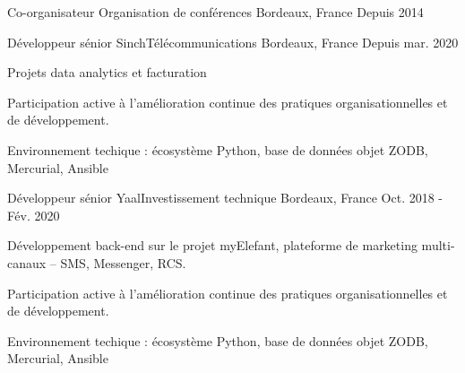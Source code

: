 

\begin{cventries}

  \cventry
    {Co-organisateur}
    {Organisation de conférences}
    {Bordeaux, France}
    {Depuis 2014}
    {
      \begin{cvsubentries}
      \end{cvsubentries}
    }

  \cventry
    {Développeur sénior}
    {Sinch{\enskip\cdotp\enskip}Télécommunications}
    {Bordeaux, France}
    {Depuis mar. 2020}
    {
      \begin{cvitems}
        \item {Projets data analytics et facturation}
        \item {Participation active à l'amélioration continue des pratiques organisationnelles et de développement.}
        \item {Environnement techique : écosystème Python, base de données objet ZODB, Mercurial, Ansible}
      \end{cvitems}
    }

  \cventry
    {Développeur sénior}
    {Yaal{\enskip\cdotp\enskip}Investissement technique}
    {Bordeaux, France}
    {Oct. 2018 - Fév. 2020}
    {
      \begin{cvitems}
        \item {Développement back-end sur le projet myElefant, plateforme de marketing multi-canaux -- SMS, Messenger, RCS.}
        \item {Participation active à l'amélioration continue des pratiques organisationnelles et de développement.}
        \item {Environnement techique : écosystème Python, base de données objet ZODB, Mercurial, Ansible}
      \end{cvitems}
    }


\end{cventries}
